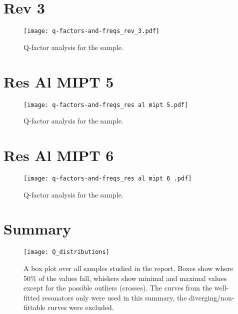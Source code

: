 \documentclass[12pt]{article}
\numberwithin{equation}{section}
\numberwithin{figure}{section}
\begin{document}
\section{Rev 3}

\begin{figure}[h!]
\centering
\texttt{[image: q-factors-and-freqs\_rev\_3.pdf]}

\caption{Q-factor analysis for the sample.}
\end{figure}

\section{Res Al MIPT 5}

\begin{figure}[h!]
\centering
\texttt{[image: q-factors-and-freqs\_res al mipt 5.pdf]}

\caption{Q-factor analysis for the sample.}
\end{figure}

\newpage

\section{Res Al MIPT 6}

\begin{figure}[h!]
\centering
\texttt{[image: q-factors-and-freqs\_res al mipt 6 .pdf]}

\caption{Q-factor analysis for the sample.}
\end{figure}

\section{Summary}

\begin{figure}[h!]
\centering
\texttt{[image: Q\_distributions]}
\caption{A box plot over all samples studied in the report. Boxes show where 50\% of the values fall, whiskers show minimal and maximal values except for the possible outliers (crosses). The curves from the well-fitted resonators only were used in this summary, the diverging/non-fittable curves were excluded.}
\end{figure}
\end{document}
